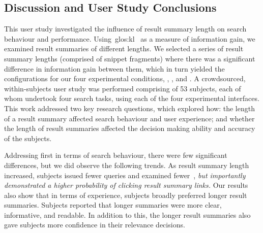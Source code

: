 \subsection{Discussion and User Study Conclusions}\label{chap:snippets:user:discussion}
This user study investigated the influence of result summary length on search behaviour and performance. Using~\gls{glos:kl}~\citep{kullback1951information} as a measure of information gain, we examined result summaries of different lengths. We selected a series of result summary lengths (comprised of snippet fragments) where there was a significant difference in information gain between them, which in turn yielded the configurations for our four experimental conditions, , ,  and . A crowdsourced, within-subjects user study was performed comprising of 53 subjects, each of whom undertook four search tasks, using each of the four experimental interfaces. This work addressed two key research questions, which explored how:  the length of a result summary affected search behaviour and user experience; and  whether the length of result summaries affected the decision making ability and accuracy of the subjects.

Addressing  first in terms of search behaviour, there were few significant differences, but we did observe the following trends. As result summary length increased, subjects issued fewer queries and examined fewer~, \emph{but importantly demonstrated a higher probability of clicking result summary links.} Our results also show that in terms of experience, subjects broadly preferred longer result summaries. Subjects reported that longer summaries were more clear, informative, and readable. In addition to this, the longer result summaries also gave subjects more confidence in their relevance decisions.


